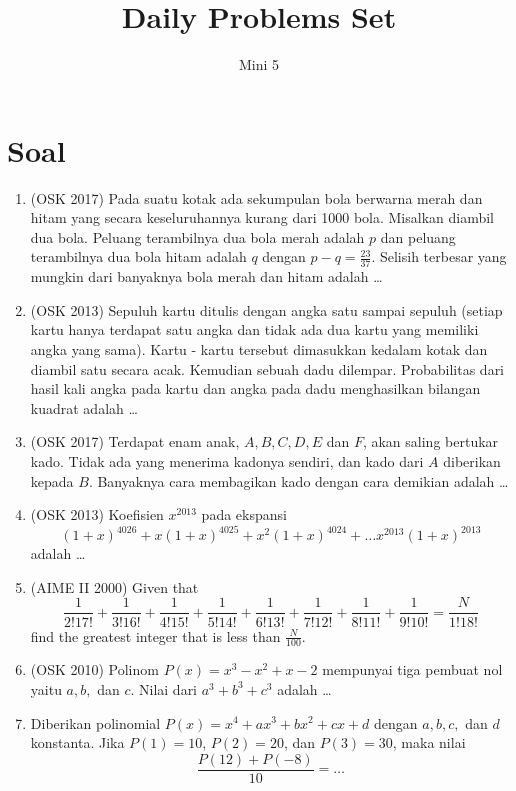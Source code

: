 \documentclass[11pt]{scrartcl}
\begin{document}
    \title{Daily Problems Set} %
    \date{}
    \author{Mini 5}
    \maketitle
    
    \section{Soal}
    \begin{enumerate}
        \item (OSK 2017) Pada suatu kotak ada sekumpulan bola berwarna merah dan hitam yang secara keseluruhannya kurang dari 1000 bola. Misalkan diambil dua bola. Peluang terambilnya dua bola merah adalah $p$ dan peluang terambilnya dua bola hitam adalah $q$ dengan $p-q =\frac{23}{37}$. Selisih terbesar yang mungkin dari banyaknya bola merah dan hitam adalah \dots

        \item (OSK 2013) Sepuluh kartu ditulis dengan angka satu sampai sepuluh (setiap kartu hanya terdapat satu angka dan tidak ada dua kartu yang memiliki angka yang sama). Kartu - kartu tersebut dimasukkan kedalam kotak dan diambil satu secara acak. Kemudian sebuah dadu dilempar. Probabilitas dari hasil kali angka pada kartu dan angka pada dadu menghasilkan bilangan kuadrat adalah \dots

        \item (OSK 2017) Terdapat enam anak, $A, B, C, D, E$ dan $F$, akan saling bertukar kado. Tidak ada yang menerima kadonya sendiri, dan kado dari $A$ diberikan kepada $B$. Banyaknya cara membagikan kado dengan cara demikian adalah \dots

        \item (OSK 2013) Koefisien $x^{2013}$ pada ekspansi
        $$(1+x)^{4026}+x(1+x)^{4025}+x^2(1+x)^{4024}+\dots x^{2013}(1+x)^{2013}$$
        adalah \dots

        \item (AIME II 2000) Given that 
        $$\frac 1{2!17!}+\frac 1{3!16!}+\frac 1{4!15!}+\frac 1{5!14!}+\frac 1{6!13!}+\frac 1{7!12!}+\frac 1{8!11!}+\frac 1{9!10!}=\frac N{1!18!}$$
        find the greatest integer that is less than $\frac N{100}$.

        \item (OSK 2010) Polinom $P(x)=x^3-x^2+x-2$ mempunyai tiga pembuat nol yaitu $a,b,$ dan $c$. Nilai dari $a^3+b^3+c^3$ adalah \dots
        
        \item Diberikan polinomial $P(x)=x^4+ax^3+bx^2+cx+d$ dengan $a,b,c,$ dan $d$ konstanta. Jika $P(1)=10$, $P(2)=20$, dan  $P(3)=30$, maka nilai
        $$\dfrac{P(12)+P(-8)}{10}=\dots$$
    \end{enumerate}
\end{document}
